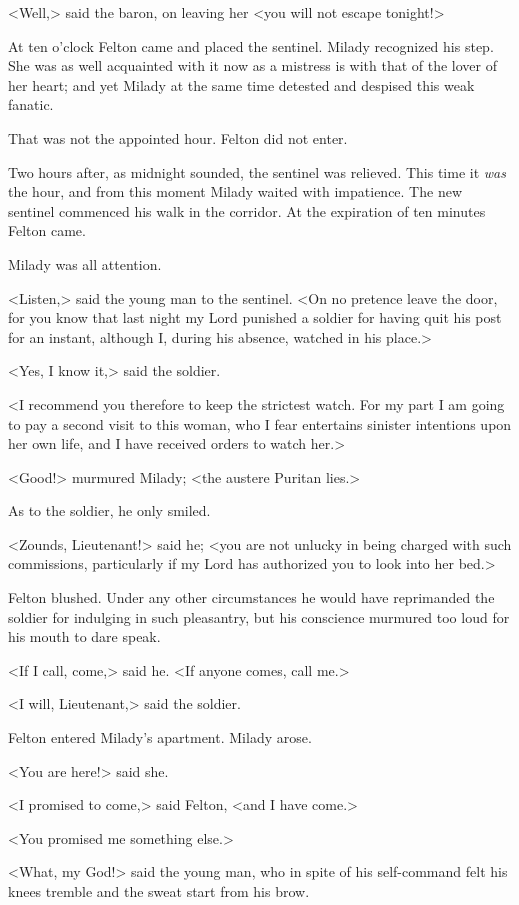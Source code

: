 <Well,> said the baron, on leaving her <you will not escape tonight!> 

At ten o'clock Felton came and placed the sentinel. Milady recognized his step. She was as well acquainted with it now as a mistress is with that of the lover of her heart; and yet Milady at the same time detested and despised this weak fanatic. 

That was not the appointed hour. Felton did not enter. 

Two hours after, as midnight sounded, the sentinel was relieved. This time it \textit{was} the hour, and from this moment Milady waited with impatience. The new sentinel commenced his walk in the corridor. At the expiration of ten minutes Felton came. 

Milady was all attention. 

<Listen,> said the young man to the sentinel. <On no pretence leave the door, for you know that last night my Lord punished a soldier for having quit his post for an instant, although I, during his absence, watched in his place.> 

<Yes, I know it,> said the soldier. 

<I recommend you therefore to keep the strictest watch. For my part I am going to pay a second visit to this woman, who I fear entertains sinister intentions upon her own life, and I have received orders to watch her.> 

<Good!> murmured Milady; <the austere Puritan lies.> 

As to the soldier, he only smiled. 

<Zounds, Lieutenant!> said he; <you are not unlucky in being charged with such commissions, particularly if my Lord has authorized you to look into her bed.> 

Felton blushed. Under any other circumstances he would have reprimanded the soldier for indulging in such pleasantry, but his conscience murmured too loud for his mouth to dare speak. 

<If I call, come,> said he. <If anyone comes, call me.> 

<I will, Lieutenant,> said the soldier. 

Felton entered Milady's apartment. Milady arose. 

<You are here!> said she. 

<I promised to come,> said Felton, <and I have come.> 

<You promised me something else.> 

<What, my God!> said the young man, who in spite of his self-command felt his knees tremble and the sweat start from his brow. 

